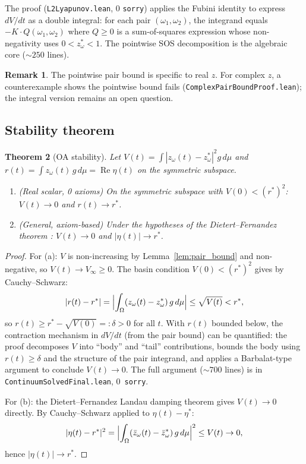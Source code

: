 \documentclass[12pt]{article}
\newtheorem{theorem}{Theorem}[section]
\theoremstyle{definition}
\newtheorem{remark}[theorem]{Remark}
\begin{document}
The proof (\texttt{L2Lyapunov.lean}, 0 \texttt{sorry}) applies the
Fubini identity to express $dV/dt$ as a double integral:
for each pair $(\omega_1, \omega_2)$, the integrand equals
$-K \cdot Q(\omega_1,\omega_2)$ where $Q \ge 0$ is a sum-of-squares
expression whose non-negativity uses $0 < z^*_\omega < 1$.
The pointwise SOS decomposition is the algebraic core (${\sim}250$ lines).

\begin{remark}
The pointwise pair bound is specific to real $z$.  For complex $z$,
a counterexample shows the pointwise bound fails
(\texttt{ComplexPairBoundProof.lean}); the integral version remains
an open question.
\end{remark}

\subsection{Stability theorem}

\begin{theorem}[OA stability]\label{thm:complex_stability}
Let $V(t) = \int |z_\omega(t) - z^*_\omega|^2 g\,d\mu$
and $r(t) = \int z_\omega(t)\,g\,d\mu = \operatorname{Re}\eta(t)$
on the symmetric subspace.
\begin{enumerate}[label=(\alph*)]
\item (Real scalar, 0 axioms) On the symmetric subspace with
$V(0) < (r^*)^2$: $V(t) \to 0$ and $r(t) \to r^*$.
\item (General, axiom-based) Under the hypotheses of the
Dietert--Fernandez theorem \cite{dietert2018}:
$V(t) \to 0$ and $|\eta(t)| \to r^*$.
\end{enumerate}
\end{theorem}

\begin{proof}
For (a): $V$ is non-increasing by Lemma~\ref{lem:pair_bound} and
non-negative, so $V(t) \to V_\infty \ge 0$.  The basin condition
$V(0) < (r^*)^2$ gives by Cauchy--Schwarz:
\[
|r(t) - r^*| = \Bigl|\int_\Omega (z_\omega(t) - z^*_\omega)\,g\,d\mu\Bigr|
\le \sqrt{V(t)} < r^*,
\]
so $r(t) \ge r^* - \sqrt{V(0)} =: \delta > 0$ for all $t$.
With $r(t)$ bounded below, the contraction mechanism in
$dV/dt$ (from the pair bound) can be quantified: the proof
decomposes $V$ into ``body'' and ``tail'' contributions,
bounds the body using $r(t) \ge \delta$ and the structure of the
pair integrand, and applies a Barbalat-type argument to conclude
$V(t) \to 0$.  The full argument (${\sim}700$ lines) is in
\texttt{ContinuumSolvedFinal.lean}, 0~\texttt{sorry}.

For (b): the Dietert--Fernandez Landau damping theorem gives $V(t) \to 0$
directly.  By Cauchy--Schwarz applied to $\eta(t) - \eta^*$:
\[
|\eta(t) - r^*|^2 = \Bigl|\int_\Omega (\bar z_\omega(t) - \bar z^*_\omega)\,g\,d\mu\Bigr|^2
\le V(t) \to 0,
\]
hence $|\eta(t)| \to r^*$.
\end{proof}
\end{document}
